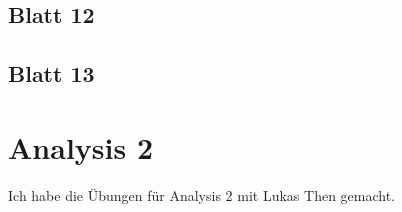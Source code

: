 \documentclass{tuftebook}
\numberwithin{Theorem}{chapter}
\theoremstyle{definition}
\theoremstyle{definition}
\begin{document}
\section{Blatt 12}

\section{Blatt 13}


\iffalse
\chapter{Lineare Algebra 2}
\section{Blatt 1}

\section{Blatt 2}

\section{Blatt 3}

\section{Blatt 4}

\section{Blatt 6}

\section{Blatt 7}

\section{Blatt 10}

\section{Blatt 11}

\section{Blatt 12}

\fi
\chapter{Analysis 2}
Ich habe die Übungen für Analysis 2 mit Lukas Then gemacht.
\end{document}

